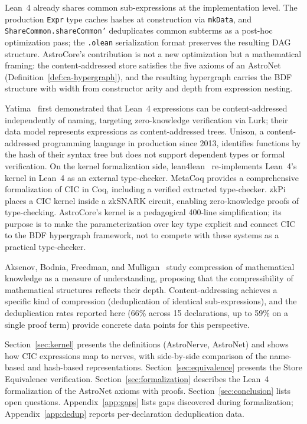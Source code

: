 Lean~4 already shares common sub-expressions at the implementation level.  The production \texttt{Expr} type caches hashes at construction via \texttt{mkData}, and \texttt{ShareCommon.shareCommon'} deduplicates common subterms as a post-hoc optimization pass; the \texttt{.olean} serialization format preserves the resulting DAG structure.  AstroCore's contribution is not a new optimization but a mathematical framing: the content-addressed store satisfies the five axioms of an AstroNet (Definition~\ref{def:ca-hypergraph}), and the resulting hypergraph carries the BDF structure with width from constructor arity and depth from expression nesting.

Yatima~\cite{Arg23} first demonstrated that Lean~4 expressions can be content-addressed independently of naming, targeting zero-knowledge verification via Lurk; their data model represents expressions as content-addressed trees.  Unison, a content-addressed programming language in production since 2013, identifies functions by the hash of their syntax tree but does not support dependent types or formal verification.  On the kernel formalization side, lean4lean~\cite{lean4lean} re-implements Lean~4's kernel in Lean~4 as an external type-checker.  MetaCoq provides a comprehensive formalization of CIC in Coq, including a verified extracted type-checker.  zkPi~\cite{zkPi} places a CIC kernel inside a zkSNARK circuit, enabling zero-knowledge proofs of type-checking.  AstroCore's kernel is a pedagogical 400-line simplification; its purpose is to make the parameterization over key type explicit and connect CIC to the BDF hypergraph framework, not to compete with these systems as a practical type-checker.

Aksenov, Bodnia, Freedman, and Mulligan~\cite{Aksenov2026} study compression of mathematical knowledge as a measure of understanding, proposing that the compressibility of mathematical structures reflects their depth.  Content-addressing achieves a specific kind of compression (deduplication of identical sub-expressions), and the deduplication rates reported here (66\% across 15 declarations, up to 59\% on a single proof term) provide concrete data points for this perspective.

Section~\ref{sec:kernel} presents the definitions (AstroNerve, AstroNet) and shows how CIC expressions map to nerves, with side-by-side comparison of the name-based and hash-based representations.  Section~\ref{sec:equivalence} presents the Store Equivalence verification.  Section~\ref{sec:formalization} describes the Lean~4 formalization of the AstroNet axioms with proofs.  Section~\ref{sec:conclusion} lists open questions.  Appendix~\ref{app:gaps} lists gaps discovered during formalization; Appendix~\ref{app:dedup} reports per-declaration deduplication data.
